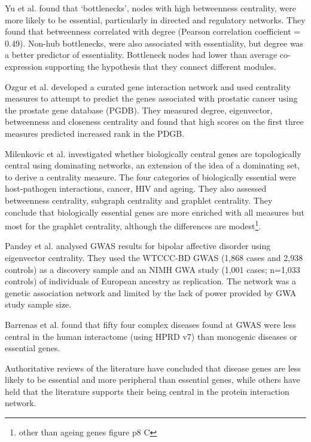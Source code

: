 Yu et al.\cite{yu2007importance} found that `bottlenecks', nodes with high betweenness centrality, were more likely to be essential, particularly in directed and regulatory networks. They found that betweenness correlated with degree (Pearson correlation coefficient = 0.49). Non-hub bottlenecks,  were also associated with essentiality, but degree was a better predictor of essentiality. Bottleneck nodes had lower than average co-expression supporting the hypothesis that they connect different modules.

Ozgur et al.\cite{ozgur2008identifying} developed a curated gene interaction network and used centrality measures to attempt to predict the genes associated with prostatic cancer using the prostate gene database (PGDB). They measured degree, eigenvector, betweenness and closeness centrality and found that high scores on the first three measures predicted increased rank in the PDGB.

Milenkovic et al.\cite{milenkovic2011dominating} investigated whether biologically central genes are topologically central using dominating networks, an extension of the idea of a dominating set, to derive a centrality measure. The four categories of biologically essential were host-pathogen interactions, cancer, HIV and ageing. They also assessed betweenness centrality, subgraph centrality and graphlet centrality. They conclude that biologically essential genes are more enriched with all measures but most for the graphlet centrality, although the differences are modest\footnote{other than ageing genes figure p8 C}.  

Pandey et al.\cite{pandey2012epistasis} analysed GWAS results for bipolar affective disorder using eigenvector centrality. They used the WTCCC-BD GWAS (1,868 cases and 2,938 controls) as a discovery sample and an NIMH GWA study (1,001 cases; n=1,033 controls) of individuals of European ancestry as replication. The network was a genetic association network and limited by the lack of power provided by GWA study sample size.

Barrenas et al. \cite{barrenas2009network} found that fifty four complex diseases found at GWAS\cite{hindorff2009potential} were less central in the human interactome (using HPRD v7\cite{keshava2009human}) than monogenic diseases or essential genes. 

Authoritative reviews of the literature have concluded that disease genes are less likely to be essential\cite{barabasi2011network} and more peripheral than essential genes, while others have held that the literature supports their being central in the protein interaction network\cite{ideker2008protein}.


